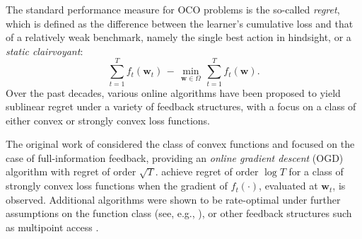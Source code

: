 The standard performance measure for OCO problems is the so-called \emph{regret}, which is defined as the difference between the learner's cumulative loss and that of a relatively weak benchmark, namely the single best action in hindsight, or a \emph{static clairvoyant}:
\begin{equation}
\label{eq:static-regret}
	\sum_{t=1}^T f_t(\mathbf{w}_t) \, - \, \min_{\mathbf{w} \in \Omega} \, \sum_{t=1}^T f_t(\mathbf{w}).
\end{equation}
Over the past decades, various online algorithms have been proposed to yield sublinear regret under a variety of feedback structures, with a focus on a class of either convex or strongly convex loss functions.
\begin{mccorrection}
The original work of \citet{zinkevich03} considered the class of convex functions and focused on the case of full-information feedback, providing an \emph{online gradient descent} (OGD) algorithm with regret of order $\sqrt{T}$. \citet{hazan07} achieve regret of order $\log T$ for a class of strongly convex loss functions when the gradient of $f_t(\cdot)$, evaluated at $\mathbf{w}_t$, is observed. Additional algorithms were shown to be rate-optimal under further assumptions on the function class (see, e.g., \citep{kalai05, hazan07}), or other feedback structures such as multipoint access \citep{agarwal10}.
\end{mccorrection}


